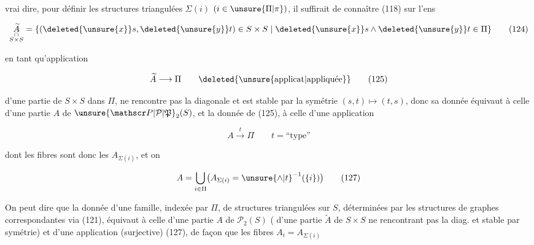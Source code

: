 
 vrai dire, pour définir les structures triangulées $\Sigma(i)$ $(i\in\unsure{\Pi|\pi})$, il suffirait de connaître (118) sur l'ens

\[
\underset{\substack{\cap\\ S\times S}}{\widetilde A}
=\{(\deleted{\unsure{x}}s,\deleted{\unsure{y}}t)\in S\times S\mid \deleted{\unsure{x}}s\mathbin{\wedge}\deleted{\unsure{y}}t\in\Pi\}
\tag*{(124)}
\]

en tant qu'application

\[
\widetilde A\longrightarrow\Pi\qquad\deleted{\text{\unsure{applicat|appliquée}}}
\tag*{(125)}
\]

d'une partie  de $S\times S$ dans $\Pi$,     ne rencontre pas la diagonale et est  stable par la symétrie $(s,t)\mapsto(t,s)$, donc sa donnée équivaut à celle d'une partie $A$ de $\unsure{\mathscr P|\mathcal P|\mathfrak P}_2(S)$, et la donnée de (125),  à celle d'une application

\[
 A\xrightarrow{t}\Pi\qquad t=\text{``type''}
 \tag*{(126)}
\]

dont les fibres sont donc les $A_{\Sigma(i)}$, et on 

\[
 A=\bigcup_{i\in\Pi}\bigl(A_{\Sigma(i)}={\unsure{\wedge|t}}^{-1}(\{i\})\bigr)
 \tag*{(127)}
\]

On peut dire que la donnée d'une famille, indexée par $\Pi$, de structures triangulées sur $S$, déterminées par les structures de graphes correspondantes via (121), équivaut à celle d'une partie $A$ de $\mathscr P_2(S)$ ( d'une partie $\widetilde A$ de $S\times S$ ne rencontrant pas la diag. et stable par symétrie) et d'une application (surjective) (127), de façon que les fibres $A_i=A_{\Sigma(i)}$

